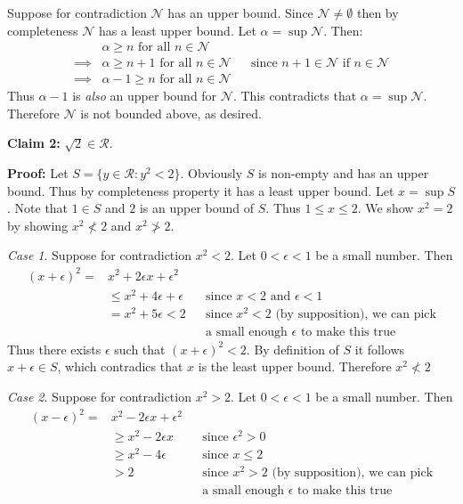 \vs

Suppose for contradiction $\mathcal{N}$ has an upper bound. Since $\mathcal{N}\neq\emptyset$ then by
completeness $\mathcal{N}$ has a least upper bound. Let $\alpha=\sup \mathcal{N}$. Then:
\begin{align*}
  &\alpha\geq n \text{ for all } n\in\mathcal{N}\\
  \implies &\alpha\geq n+1 \text{ for all } n\in\mathcal{N}&&\text{since $n+1\in\mathcal{N}$ if $n\in\mathcal{N}$}\\
  \implies &\alpha-1\geq n \text{ for all } n\in\mathcal{N}
\end{align*}
Thus $\alpha-1$ is \textit{also} an upper bound for $\mathcal{N}$. This contradicts
that $\alpha=\sup \mathcal{N}$. Therefore $\mathcal{N}$ is not bounded above, as desired.

\vs

\textbf{Claim 2:} $\sqrt{2}\in\mathcal{R}$.

\textbf{Proof:} Let $S=\{y\in\mathcal{R} : y^{2}<2\}$. Obviously $S$ is non-empty
and has an upper bound. Thus by completeness property it has a least
upper bound. Let $x=\sup S$. Note that $1\in S$ and $2$ is an upper
bound of $S$. Thus $1\leq x\leq2$. We show $x^{2}=2$ by showing
$x^{2}\not<2$ and $x^{2}\not>2$.

\vs

\textit{Case 1}. Suppose for contradiction $x^{2}<2$. Let $0<\epsilon<1$ be a
small number. Then
\begin{align*}
  {(x+\epsilon)}^{2}=&x^{2}+2\epsilon x+\epsilon^{2}\\
              &\leq x^{2}+4\epsilon+\epsilon&&\text{since $x<2$ and $\epsilon<1$}\\
              &=x^{2}+5\epsilon<2&&\text{since $x^{2}<2$ (by supposition), we
                             can pick}\\
              &&&\text{a small enough $\epsilon$ to make this true}
\end{align*}
Thus there exists $\epsilon$ such that ${(x+\epsilon)}^{2}<2$. By definition of
$S$ it follows $x+\epsilon\in S$, which contradics that $x$ is the least upper
bound. Therefore $x^{2}\not<2$

\vs

\textit{Case 2}. Suppose for contradiction $x^{2}>2$. Let $0<\epsilon<1$ be a
small number. Then
\begin{align*}
  {(x-\epsilon)}^{2}=&x^{2}-2\epsilon x+\epsilon^{2}\\
              &\geq x^{2}-2\epsilon x&&\text{since $\epsilon^{2}>0$}\\
              &\geq x^{2}-4\epsilon&&\text{since $x\leq2$}\\
              &>2&&\text{since $x^{2}>2$ (by supposition), we
                             can pick}\\
              &&&\text{a small enough $\epsilon$ to make this true}
\end{align*}


